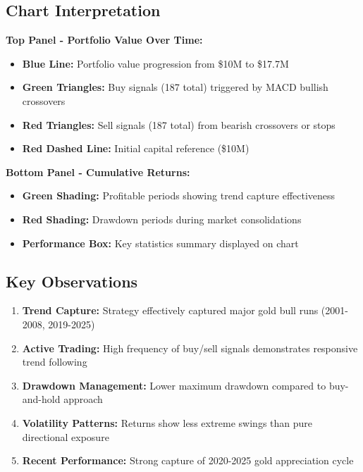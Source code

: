 \documentclass[11pt,a4paper]{article}
\begin{document}
\subsection{Chart Interpretation}

\textbf{Top Panel - Portfolio Value Over Time:}
\begin{itemize}
    \item \textbf{Blue Line:} Portfolio value progression from \$10M to \$17.7M
    \item \textbf{Green Triangles:} Buy signals (187 total) triggered by MACD bullish crossovers
    \item \textbf{Red Triangles:} Sell signals (187 total) from bearish crossovers or stops
    \item \textbf{Red Dashed Line:} Initial capital reference (\$10M)
\end{itemize}

\textbf{Bottom Panel - Cumulative Returns:}
\begin{itemize}
    \item \textbf{Green Shading:} Profitable periods showing trend capture effectiveness
    \item \textbf{Red Shading:} Drawdown periods during market consolidations
    \item \textbf{Performance Box:} Key statistics summary displayed on chart
\end{itemize}

\subsection{Key Observations}

\begin{enumerate}
    \item \textbf{Trend Capture:} Strategy effectively captured major gold bull runs (2001-2008, 2019-2025)
    \item \textbf{Active Trading:} High frequency of buy/sell signals demonstrates responsive trend following
    \item \textbf{Drawdown Management:} Lower maximum drawdown compared to buy-and-hold approach
    \item \textbf{Volatility Patterns:} Returns show less extreme swings than pure directional exposure
    \item \textbf{Recent Performance:} Strong capture of 2020-2025 gold appreciation cycle
\end{enumerate}

\newpage
\end{document}
